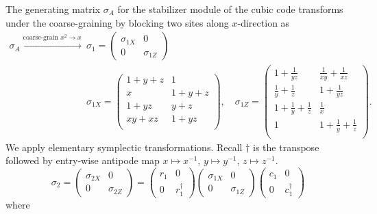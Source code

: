 The generating matrix $\sigma_A$
for the stabilizer module of the cubic code
transforms under the coarse-graining by blocking two sites along $x$-direction as
\begin{align*}
 \sigma_A \xrightarrow{\text{coarse-grain }x^2 \to x} \quad
& \sigma_1 = \begin{pmatrix} \sigma_{1X} & 0 \\ 0 & \sigma_{1Z} \end{pmatrix} \\
& \sigma_{1X} =
\begin{pmatrix}
 1+y+z   & 1     \\
 x       & 1+y+z \\
 1+y z   & y+z   \\
 x y+x z & 1+y z \\
\end{pmatrix}, \quad
\sigma_{1Z} =
\begin{pmatrix}
 1+\frac{1}{y z} & \frac{1}{x y}+\frac{1}{x z} \\
 \frac{1}{y}+\frac{1}{z} & 1+\frac{1}{y z} \\
 1+\frac{1}{y}+\frac{1}{z} & \frac{1}{x} \\
 1 & 1+\frac{1}{y}+\frac{1}{z} \\
\end{pmatrix}.
\end{align*}
We apply elementary symplectic transformations.
Recall $\dagger$ is the transpose followed by entry-wise antipode 
map $x \mapsto x^{-1}$, $y \mapsto y^{-1}$, $z \mapsto z^{-1}$.
\[
\sigma_2 = \begin{pmatrix} \sigma_{2X} & 0 \\ 0 & \sigma_{2Z} \end{pmatrix}
 = 
\begin{pmatrix} r_1 & 0 \\ 0 & r_1^\dagger \end{pmatrix} 
\begin{pmatrix} \sigma_{1X} & 0 \\ 0 & \sigma_{1Z} \end{pmatrix}
\begin{pmatrix} c_1 & 0 \\ 0 & c_1^\dagger \end{pmatrix}
 \]
where

